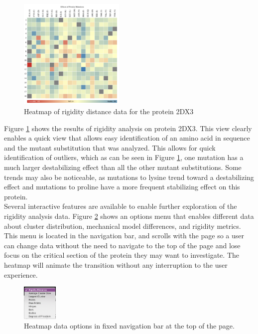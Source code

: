 \documentclass[11pt]{IEEEtran}
\begin{document}
\begin{figure}[ht]
  \center
  \includegraphics[width=0.45\textwidth]{figs/heatmap_full.png}
  \caption{Heatmap of rigidity distance data for the protein 2DX3}
  \label{fig:heatmapmain}
\end{figure}

Figure \ref{fig:heatmapmain} shows the results of rigidity analysis on protein 2DX3. This view clearly enables a quick view that allows easy identification of an amino acid in sequence and the mutant substitution that was analyzed. This allows for quick identification of outliers, which as can be seen in Figure \ref{fig:heatmapmain}, one mutation has a much larger destabilizing effect than all the other mutant substitutions. Some trends may also be noticeable, as mutations to lysine trend toward a destabilizing effect and mutations to proline have a more frequent stabilizing effect on this protein. \\

Several interactive features are available to enable further exploration of the rigidity analysis data. Figure \ref{fig:heatmapoptions}  shows an options menu that enables different data about cluster distribution, mechanical model differences, and rigidity metrics. This menu is located in the navigation bar, and scrolls with the page so a user can change data without the need to navigate to the top of the page and lose focus on the critical section of the protein they may want to investigate. The heatmap will animate the transition without any interruption to the user experience.\\
\begin{figure}[ht]
  \center
  \includegraphics[width=0.15\textwidth]{figs/heatmap_options.png}
  \caption{Heatmap data options in fixed navigation bar at the top of the page.}
  \label{fig:heatmapoptions}
\end{figure}
\end{document}
